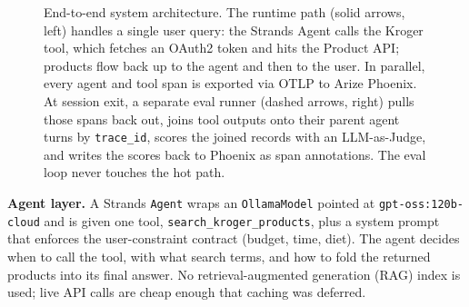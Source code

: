 \documentclass{article}
\begin{document}
\begin{figure}[!h]
\caption{End-to-end system architecture. The runtime path (solid arrows, left) handles a single user query: the Strands Agent calls the Kroger tool, which fetches an OAuth2 token and hits the Product API; products flow back up to the agent and then to the user. In parallel, every agent and tool span is exported via OTLP to Arize Phoenix. At session exit, a separate eval runner (dashed arrows, right) pulls those spans back out, joins tool outputs onto their parent agent turns by \texttt{trace\_id}, scores the joined records with an LLM-as-Judge, and writes the scores back to Phoenix as span annotations. The eval loop never touches the hot path.}
\label{fig:arch}
\end{figure}

\textbf{Agent layer.} A Strands \texttt{Agent} wraps an \texttt{OllamaModel} pointed at \texttt{gpt-oss:120b-cloud} and is given one tool, \texttt{search\_kroger\_products}, plus a system prompt that enforces the user-constraint contract (budget, time, diet). The agent decides when to call the tool, with what search terms, and how to fold the returned products into its final answer. No retrieval-augmented generation (RAG) index is used; live API calls are cheap enough that caching was deferred.
\end{document}
